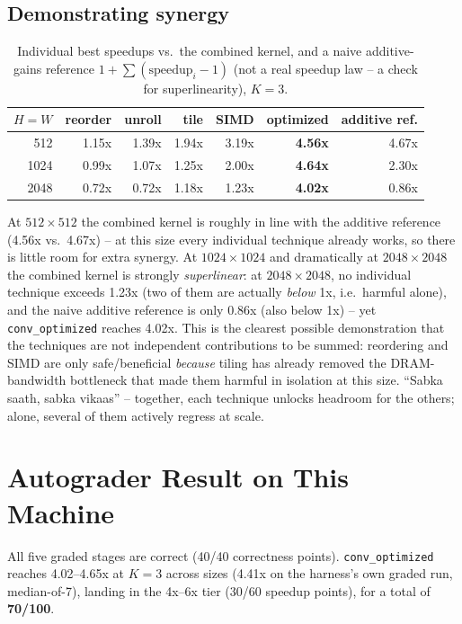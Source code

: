 \documentclass[11pt]{article}
\begin{document}
\subsection*{Demonstrating synergy}
\begin{table}[h]
\centering
\caption{Individual best speedups vs.\ the combined kernel, and a naive additive-gains
reference $1+\sum(\text{speedup}_i - 1)$ (not a real speedup law -- a check for
superlinearity), $K{=}3$.}
\begin{tabular}{r r r r r r r}
\toprule
$H{=}W$ & reorder & unroll & tile & SIMD & \textbf{optimized} & additive ref. \\
\midrule
512  & 1.15x & 1.39x & 1.94x & 3.19x & \textbf{4.56x} & 4.67x \\
1024 & 0.99x & 1.07x & 1.25x & 2.00x & \textbf{4.64x} & 2.30x \\
2048 & 0.72x & 0.72x & 1.18x & 1.23x & \textbf{4.02x} & 0.86x \\
\bottomrule
\end{tabular}
\end{table}

At $512{\times}512$ the combined kernel is roughly in line with the additive reference
(4.56x vs.\ 4.67x) -- at this size every individual technique already works, so there is
little room for extra synergy. At $1024{\times}1024$ and dramatically at
$2048{\times}2048$ the combined kernel is strongly \emph{superlinear}: at
$2048{\times}2048$, no individual technique exceeds 1.23x (two of them are actually
\emph{below} 1x, i.e.\ harmful alone), and the naive additive reference is only 0.86x
(also below 1x) -- yet \texttt{conv\_optimized} reaches 4.02x. This is the clearest
possible demonstration that the techniques are not independent contributions to be
summed: reordering and SIMD are only safe/beneficial \emph{because} tiling has already
removed the DRAM-bandwidth bottleneck that made them harmful in isolation at this size.
``Sabka saath, sabka vikaas'' -- together, each technique unlocks headroom for the
others; alone, several of them actively regress at scale.

\section*{Autograder Result on This Machine}
All five graded stages are correct (40/40 correctness points). \texttt{conv\_optimized}
reaches 4.02--4.65x at $K{=}3$ across sizes (4.41x on the harness's own graded run,
median-of-7), landing in the 4x--6x tier (30/60 speedup points), for a total of
\textbf{70/100}.
\end{document}
